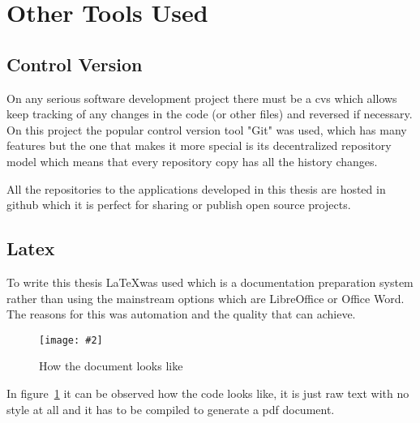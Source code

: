 \documentclass[hidelinks,11pt,a4paper,oneside,article]{memoir}
\newcommand{\putimage}[3][10] %
{
\begin{figure}[h]
	\centering
	\captionsetup{justification=centering}
	\texttt{[image: \#2]}
	\caption{#3}
	\label{fig:#2}
\end{figure}
}
\begin{document}

\section{Other Tools Used}

\subsection{Control Version}
On any serious software development project there must be a \gls{cvs} which allows keep tracking of any changes in the code (or other files) and reversed if necessary. On this project the popular control version tool "Git" was used, which has many features but the one that makes it more special is its decentralized repository model which means that every repository copy has all the history changes.

All the repositories to the applications developed in this thesis are hosted in \gls{github} which it is perfect for sharing or publish open source projects.

\subsection{Latex}
To write this thesis \LaTeX was used which is a documentation preparation system rather than using the mainstream options which are LibreOffice or Office Word. The reasons for this was automation and the quality that can achieve.

    \putimage{latex-look}{How the document looks like}
    
In figure~\ref{fig:latex-look} it can be observed how the code looks like, it is just raw text with no style at all and it has to be compiled to generate a \gls{pdf} document.
\end{document}
